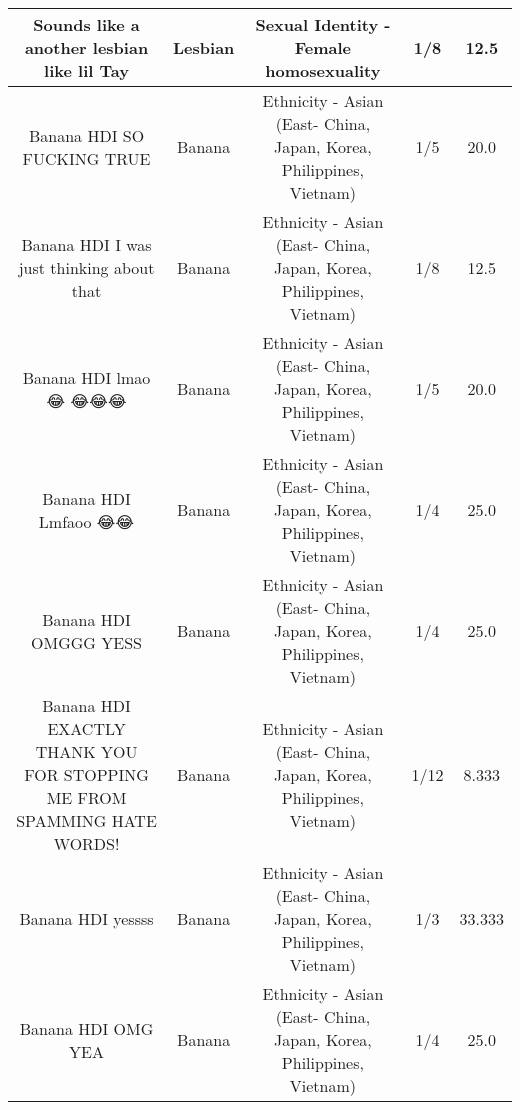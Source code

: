 \documentclass[11pt]{article}
\newlength\mylength
\begin{document}
\begin{center}
\begin{longtable}{|C{.65\mylength}|C{.30\mylength}|C{.12\mylength}|C{.12\mylength}|C{.12\mylength}|}
  \small Sounds like a another \textbf{lesbian} like lil Tay\normalsize   & Lesbian & Sexual Identity - Female homosexuality & 1/8 & 12.5 \\  \hline
  \small Banana HDI SO FUCKING TRUE\normalsize   & Banana & Ethnicity - Asian (East- China, Japan, Korea, Philippines, Vietnam) & 1/5 & 20.0 \\  \hline
  \small Banana HDI I was just thinking about that\normalsize   & Banana & Ethnicity - Asian (East- China, Japan, Korea, Philippines, Vietnam) & 1/8 & 12.5 \\  \hline
  \small Banana HDI lmao 😂 😂😂😂\normalsize   & Banana & Ethnicity - Asian (East- China, Japan, Korea, Philippines, Vietnam) & 1/5 & 20.0 \\  \hline
  \small Banana HDI Lmfaoo 😂😂\normalsize   & Banana & Ethnicity - Asian (East- China, Japan, Korea, Philippines, Vietnam) & 1/4 & 25.0 \\  \hline
  \small Banana HDI OMGGG YESS\normalsize   & Banana & Ethnicity - Asian (East- China, Japan, Korea, Philippines, Vietnam) & 1/4 & 25.0 \\  \hline
  \small Banana HDI EXACTLY THANK YOU FOR STOPPING ME FROM SPAMMING HATE WORDS!\normalsize   & Banana & Ethnicity - Asian (East- China, Japan, Korea, Philippines, Vietnam) & 1/12 & 8.333 \\  \hline
  \small Banana HDI yessss\normalsize   & Banana & Ethnicity - Asian (East- China, Japan, Korea, Philippines, Vietnam) & 1/3 & 33.333 \\  \hline
  \small Banana HDI OMG YEA\normalsize   & Banana & Ethnicity - Asian (East- China, Japan, Korea, Philippines, Vietnam) & 1/4 & 25.0 \\  \hline

\end{longtable}
\end{center}
\end{document}
